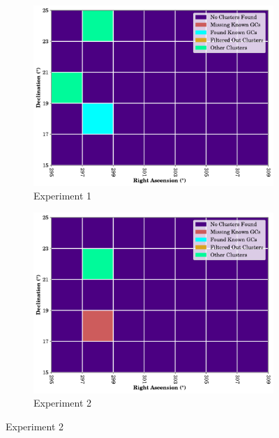 \begin{figure}[H]
    \centering
    \caption{\label{fig:a2-cluster-overview}Clustering Results Across A2: $\SI{2.0}{\degree}\times\SI{2.0}{\degree}$ for All Experiments}
    \begin{subfigure}[b]{0.49\textwidth}
        \includegraphics[width=\textwidth]{./figures/rasters/grids/grid-run-01-a2.pdf}
        \caption{Experiment 1}
    \end{subfigure}
    \begin{subfigure}[b]{0.49\textwidth}
        \includegraphics[width=\textwidth]{./figures/rasters/grids/grid-run-02-a2.pdf}
        \caption{Experiment 2}
    \end{subfigure}


\end{figure}
